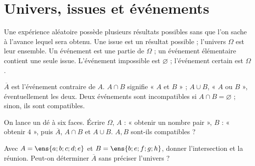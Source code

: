 \section{Univers, issues et événements}
\begin{keypoint}[Vocabulaire]
Une expérience aléatoire possède plusieurs résultats possibles sans que l'on sache à l'avance lequel sera obtenu. Une issue est un résultat possible ; l'univers $\Omega$ est leur ensemble. Un événement est une partie de $\Omega$ ; un événement élémentaire contient une seule issue.
L'événement impossible est $\varnothing$ ; l'événement certain est $\Omega$.
\end{keypoint}
\begin{keypoint}
$\overline A$ est l'événement contraire de $A$. $A\cap B$ signifie « $A$ et $B$ » ; $A\cup B$, « $A$ ou $B$ », éventuellement les deux. Deux événements sont incompatibles si $A\cap B=\varnothing$ ; sinon, ils sont compatibles.
\end{keypoint}
\begin{example}On lance un dé à six faces. Écrire $\Omega$, $A$ : « obtenir un nombre pair », $B$ : « obtenir $4$ », puis $\overline A$, $A\cap B$ et $A\cup B$. $A,B$ sont-ils compatibles ?\end{example}
\begin{example}Avec $A=\ens{a;b;c;d;e}$ et $B=\ens{b;e;f;g;h}$, donner l'intersection et la réunion. Peut-on déterminer $\overline A$ sans préciser l'univers ?\end{example}

